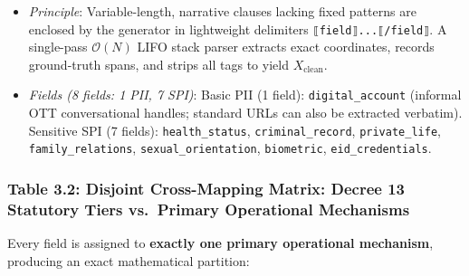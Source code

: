 \documentclass[
]{article}
\providecommand{\tightlist}{%
  \setlength{\itemsep}{0pt}\setlength{\parskip}{0pt}}
\begin{document}
\begin{enumerate}
  \begin{itemize}
  \tightlist
  \item
    \emph{Principle}: Variable-length, narrative clauses lacking fixed
    patterns are enclosed by the generator in lightweight delimiters
    \texttt{⟦field⟧...⟦/field⟧}. A single-pass \(\mathcal{O}(N)\) LIFO
    stack parser extracts exact coordinates, records ground-truth spans,
    and strips all tags to yield \(X_{\text{clean}}\).
  \item
    \emph{Fields (8 fields: 1 PII, 7 SPI)}: Basic PII (1 field):
    \texttt{digital\_account} (informal OTT conversational handles;
    standard URLs can also be extracted verbatim). Sensitive SPI (7
    fields): \texttt{health\_status}, \texttt{criminal\_record},
    \texttt{private\_life}, \texttt{family\_relations},
    \texttt{sexual\_orientation}, \texttt{biometric},
    \texttt{eid\_credentials}.
  \end{itemize}
\end{enumerate}

\subsubsection{Table 3.2: Disjoint Cross-Mapping Matrix: Decree 13
Statutory Tiers vs.~Primary Operational
Mechanisms}\label{table-3.2-disjoint-cross-mapping-matrix-decree-13-statutory-tiers-vs.-primary-operational-mechanisms}

Every field is assigned to \textbf{exactly one primary operational
mechanism}, producing an exact mathematical partition:
\end{document}

